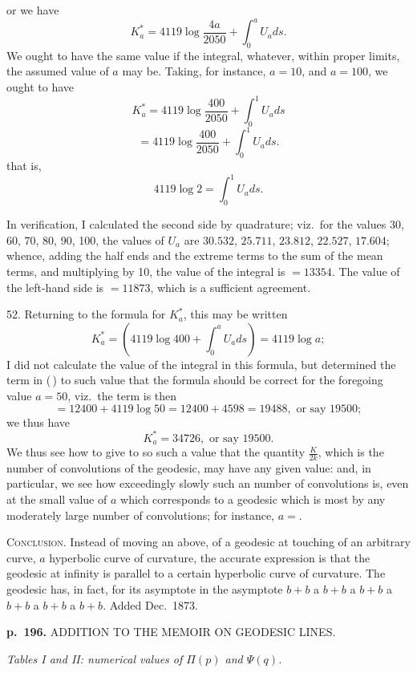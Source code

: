 \documentclass[11pt,a4paper]{article}
\begin{document}
or we have
\[
K_a^{*} = 4119 \log \frac{4a}{2050} + \int_0^{a} U_a ds.
\]
We ought to have the same value if the integral, whatever, within proper limits, the assumed value of $a$ may be.  Taking, for instance, $a = 10$, and $a = 100$, we ought to have
\[
K_a^{*} = 4119 \log \frac{400}{2050} + \int_0^{1} U_a ds
\]
\[
= 4119 \log \frac{400}{2050} + \int_0^{1} U_a ds.
\]
that is,
\[
4119 \log 2 = \int_0^{1} U_a ds.
\]

In verification, I calculated the second side by quadrature; viz.\ for the values 30, 60, 70, 80, 90, 100, the values of $U_a$ are $30.532$, $25.711$, $23.812$, $22.527$, $17.604$; whence, adding the half ends and the extreme terms to the sum of the mean terms, and multiplying by 10, the value of the integral is $= 13354$. The value of the left-hand side is $= 11873$, which is a sufficient agreement.

52. Returning to the formula for $K_a^{*}$, this may be written
\[
K_a^{*} = (4119 \log 400 + \int_0^a U_a ds) = 4119 \log a;
\]
I did not calculate the value of the integral in this formula, but determined the term in ($\,$) to such value that the formula should be correct for the foregoing value $a = 50$, viz.\ the term is then
\[
= 12400 + 4119 \log 50 = 12400 + 4598 = 19488, \text{ or say } 19500;
\]
we thus have
\[
K_a^{*} = 34726, \text{ or say } 19500.
\]
We thus see how to give to so such a value that the quantity $\frac{K}{2k}$, which is the number of convolutions of the geodesic, may have any given value: and, in particular, we see how exceedingly slowly such an number of convolutions is, even at the small value of $a$ which corresponds to a geodesic which is most by any moderately large number of convolutions; for instance, $a = $.

\textsc{Conclusion.} Instead of moving an above, of a geodesic at touching of an arbitrary curve, $a$ hyperbolic curve of curvature, the accurate expression is that the geodesic at infinity is parallel to a certain hyperbolic curve of curvature.  The geodesic has, in fact, for its asymptote in the asymptote $b + b$ a $b + b$ a $b + b$ a $b + b$ a $b + b$ a $b + b$. Added Dec.\ 1873.

\clearpage

\noindent
\textbf{p.~196.}  ADDITION TO THE MEMOIR ON GEODESIC LINES.

\begin{center}
\textit{Tables I and II: numerical values of $\Pi(p)$ and $\Psi(q)$.}
\end{center}
\end{document}
